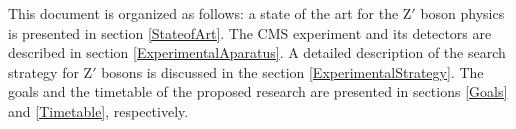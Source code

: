This document is organized as follows: a state of the art for the Z$'$ boson physics is presented in section
\ref{StateofArt}. The CMS experiment and its detectors are described in section \ref{ExperimentalAparatus}.
A detailed description of the search strategy for Z$'$ bosons is discussed in the section \ref{ExperimentalStrategy}.
The goals and the timetable of the proposed research are presented in sections \ref{Goals} and \ref{Timetable}, respectively.








